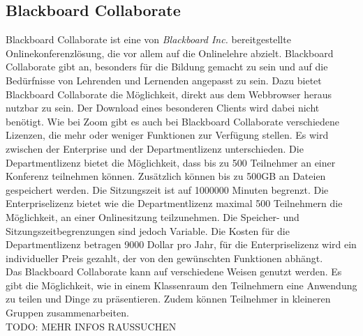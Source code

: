 \subsection{Blackboard Collaborate}
Blackboard Collaborate ist eine von \textit{Blackboard Inc.} bereitgestellte Onlinekonferenzlösung, die vor allem auf die Onlinelehre abzielt.
\autocite[Vgl.][]{M_Blackboard.o.J.}
Blackboard Collaborate gibt an, besonders für die Bildung gemacht zu sein und auf die Bedürfnisse von Lehrenden und Lernenden angepasst zu sein.
Dazu bietet Blackboard Collaborate die Möglichkeit, direkt aus dem Webbrowser heraus nutzbar zu sein.
Der Download eines besonderen Clients wird dabei nicht benötigt.
Wie bei Zoom gibt es auch bei Blackboard Collaborate verschiedene Lizenzen, die mehr oder weniger Funktionen zur Verfügung stellen.
Es wird zwischen der Enterprise und der Departmentlizenz unterschieden.
Die Departmentlizenz bietet die Möglichkeit, dass bis zu 500 Teilnehmer an einer Konferenz teilnehmen können.
Zusätzlich können bis zu 500GB an Dateien gespeichert werden. Die Sitzungszeit ist auf 1000000 Minuten begrenzt.
Die Enterpriselizenz bietet wie die Departmentlizenz maximal 500 Teilnehmern die Möglichkeit, an einer Onlinesitzung teilzunehmen.
Die Speicher- und Sitzungszeitbegrenzungen sind jedoch Variable.
Die Kosten für die Departmentlizenz betragen 9000 Dollar pro Jahr, für die Enterpriselizenz wird ein individueller Preis gezahlt, der von den gewünschten Funktionen abhängt.
\autocite[Vgl.][]{M_Blackboard.o.J.}
\\
Das Blackboard Collaborate kann auf verschiedene Weisen genutzt werden.
Es gibt die Möglichkeit, wie in einem Klassenraum den Teilnehmern eine Anwendung zu teilen und Dinge zu präsentieren.
Zudem können Teilnehmer in kleineren Gruppen zusammenarbeiten.
\autocite[Vgl.][]{M_Blackboard.o.J.}
\\
TODO: MEHR INFOS RAUSSUCHEN

